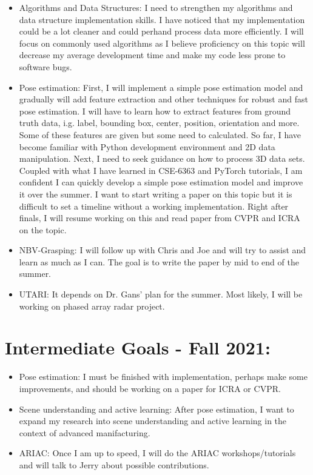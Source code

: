 \documentclass[11pt]{article}
\begin{document}
\begin{itemize}
      \item Algorithms and Data Structures: I need to strengthen my algorithms
      and data structure implementation skills. I have
      noticed that my implementation could be a lot cleaner and could perhand
      process data more efficiently. I will focus on commonly used algorithms
      as I believe proficiency on this topic will decrease my average
      development time and make my code less prone to software bugs.
      \item Pose estimation: First, I will implement a simple pose estimation
      model and gradually will add feature extraction and other techniques for
      robust and fast pose estimation. I will have to learn how to extract
      features from ground truth data, i.g. label, bounding box, center, position,
      orientation and more. Some of these features are given but some need to
      calculated. So far, I have become familiar with Python development
      environment and 2D data manipulation. Next, I need to seek guidance on
      how to process 3D data sets. Coupled with what I have learned in CSE-6363
      and PyTorch tutorials, I am confident I can quickly develop a simple
      pose estimation model and improve it over the summer. I want to start
      writing a paper on this topic but it is difficult to set a timeline
      without a working implementation. Right after finals, I will resume working
      on this and read paper from CVPR and ICRA on the topic.
      \item NBV-Grasping: I will follow up with Chris and Joe and will try to
      assist and learn as much as I can. The goal is to write the paper by mid
      to end of the summer.
      \item UTARI: It depends on Dr. Gans' plan for the summer. Most likely, I will
      be working on phased array radar project.
\end{itemize}

\section{Intermediate Goals - Fall 2021:}
\begin{itemize}
      \item Pose estimation: I must be finished with implementation, perhaps
      make some improvements, and should be working on a paper for ICRA or CVPR.
      \item Scene understanding and active learning: After pose estimation, I
      want to expand my research into scene understanding and active learning in
      the context of advanced manifacturing.
      \item ARIAC: Once I am up to speed, I will do the ARIAC workshops/tutorials
      and will talk to Jerry about possible contributions.
\end{itemize}


\newpage


\end{document}
